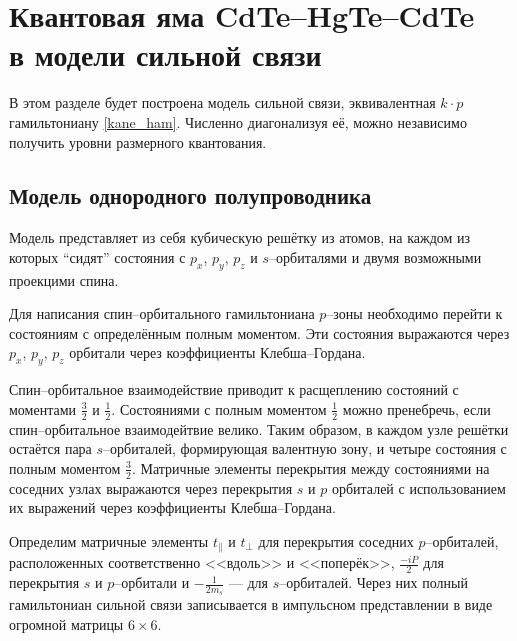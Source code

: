 \section{Квантовая яма CdTe--HgTe--CdTe\\ в модели сильной связи}
В этом разделе будет построена модель сильной связи, эквивалентная $k\cdot p$ гамильтониану
\eqref{kane_ham}. Численно диагонализуя её, можно независимо получить уровни размерного 
квантования.
\subsection{Модель однородного полупроводника}
Модель представляет из себя 
кубическую решётку из атомов, на каждом из которых ``сидят'' состояния
с $p_x$, $p_y$, $p_z$ и $s$--орбиталями и двумя 
возможными проекцими спина.

Для написания
спин--орбитального гамильтониана $p$--зоны необходимо перейти к состояниям с определённым
полным моментом. Эти состояния выражаются через $p_x$, $p_y$, $p_z$ орбитали через
коэффициенты Клебша--Гордана.

Спин--орбитальное взаимодействие приводит к расщеплению состояний с моментами $\frac32$ и
$\frac12$.
Состояниями с полным моментом $\frac{1}{2}$ 
можно пренебречь, если спин--орбитальное взаимодейтвие велико. Таким образом, в каждом
узле решётки остаётся пара $s$--орбиталей, формирующая валентную зону, и четыре состояния
с полным моментом $\frac{3}{2}$. Матричные элементы перекрытия между состояниями на соседних
узлах выражаются через перекрытия $s$ и $p$ орбиталей с использованием их выражений через
коэффициенты Клебша--Гордана.

Определим матричные элементы $t_\parallel$ и $t_\perp$ для перекрытия соседних $p$--орбиталей,
расположенных соответственно <<вдоль>> и <<поперёк>>, $\frac{-iP}{2}$ для перекрытия
$s$ и $p$--орбитали и $-\frac{1}{2m_s}$ --- для $s$--орбиталей. Через них полный гамильтониан
сильной связи записывается в импульсном представлении в виде огромной матрицы $6\times6$. 

